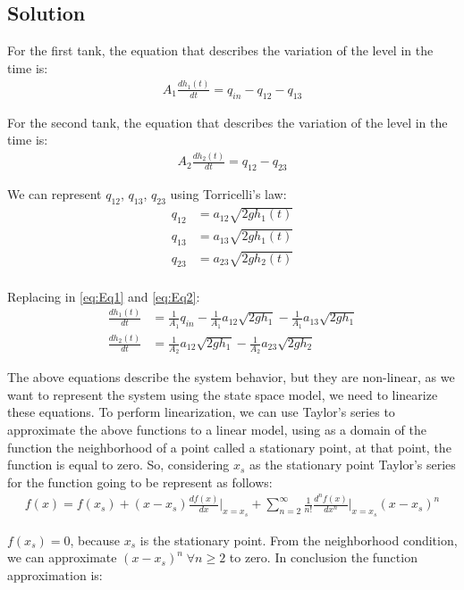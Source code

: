 \documentclass[a4paper,11pt]{article}
\begin{document}
\subsection*{Solution} 					
\par For the first tank, the equation that describes the variation of the level in the time is:
\begin{align}
\label{eq:Eq1}
A_1\frac{dh_1(t)}{dt}= q_{in}- q_{12}-q_{13}
\end{align}
\par For the second tank, the equation that describes the variation of the level in the time is:
\begin{align}
\label{eq:Eq2}
A_2\frac{dh_2(t)}{dt}= q_{12}-q_{23}
\end{align}
\par We can represent $q_{12}$, $q_{13}$, $q_{23}$ using Torricelli's law:
\begin{align*}
q_{12} &= a_{12}\sqrt{2gh_1(t)}\\
q_{13} &= a_{13}\sqrt{2gh_1(t)}\\
q_{23} &= a_{23}\sqrt{2gh_2(t)}\\
\end{align*}
\par Replacing in \ref{eq:Eq1} and \ref{eq:Eq2}:
\begin{align}
\label{eq:Eq3}
\frac{dh_1(t)}{dt} &= \frac{1}{A_1}q_{in}-\frac{1}{A_1}a_{12}\sqrt{2gh_1}-\frac{1}{A_1}a_{13}\sqrt{2gh_1}\\
\label{eq:Eq4}
\frac{dh_2(t)}{dt} &= \frac{1}{A_2}a_{12}\sqrt{2gh_1}-\frac{1}{A_2}a_{23}\sqrt{2gh_2}
\end{align}
\par The above equations describe the system behavior, but they are non-linear, as we want to represent the system using the state space model, we need to linearize these equations. To perform linearization, we can use Taylor's series to approximate the above functions to a linear model, using as a domain of the function the neighborhood of a point called a stationary point, at that point, the function is equal to zero. So, considering $ x_s $ as the stationary point Taylor's series for the function going to be represent as follows:
\begin{align*}
f(x) = f(x_s)+ (x-x_s)\frac{df(x)}{dx}\Big\vert_{x=x_s}+ \sum_{n=2}^\infty\frac{1}{n!}\frac{d^nf(x)}{dx^n}\Big\vert_{x=x_s}(x-x_s)^n
\end{align*}
\par $f(x_s)=0$, because $x_s$ is the stationary point. From the neighborhood condition, we can approximate $ (x-x_s) ^ n \; \forall n \geq 2 $ to zero. In conclusion the function approximation is:
\end{document}
